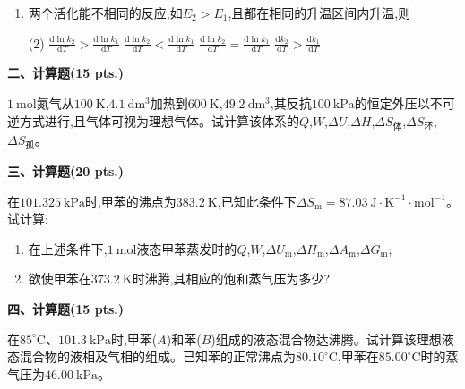 \begin{enumerate}[label=\arabic*., itemsep=1.5ex]
    \begin{tasks}(4)
        \task $(\partial H/\partial S)_p$
        \task $(\partial G/\partial T)_p$
        \task $(\partial H/\partial T)_S$
        \task $(\partial U/\partial V)_S$
    \end{tasks}
    \item 两个活化能不相同的反应,如$E_2>E_1$,且都在相同的升温区间内升温,则
    \begin{tasks}(2)
        \task $\displaystyle \frac{\mathrm{d}\ln k_2}{\mathrm{d}T}>\frac{\mathrm{d}\ln k_1}{\mathrm{d}T}$
        \task $\displaystyle \frac{\mathrm{d}\ln k_2}{\mathrm{d}T}<\frac{\mathrm{d}\ln k_1}{\mathrm{d}T}$
        \task $\displaystyle \frac{\mathrm{d}\ln k_2}{\mathrm{d}T}=\frac{\mathrm{d}\ln k_1}{\mathrm{d}T}$
        \task $\displaystyle \frac{\mathrm{d}k_2}{\mathrm{d}T}>\frac{\mathrm{d}k_1}{\mathrm{d}T}$
    \end{tasks}
\end{enumerate}

\vspace{0.5cm}
\noindent\textbf{二、计算题(15 pts.)}

$1\ \mathrm{mol}$氮气从$100\ \mathrm{K}$,$4.1\ \mathrm{dm^3}$加热到$600\ \mathrm{K}$,$49.2\ \mathrm{dm^3}$,其反抗$100\ \mathrm{kPa}$的恒定外压以不可逆方式进行,且气体可视为理想气体。试计算该体系的$Q$,$W$,$\Delta U$,$\Delta H$,$\Delta S_\text{体}$,$\Delta S_\text{环}$,$\Delta S_\text{孤}$。

\vspace{0.5cm}
\noindent\textbf{三、计算题(20 pts.)}

在$101.325\ \mathrm{kPa}$时,甲苯的沸点为$383.2\ \mathrm{K}$,已知此条件下$\Delta S_\mathrm{m}=87.03\ \mathrm{J\cdot K^{-1}\cdot mol^{-1}}$。试计算:
\begin{enumerate}[label=(\arabic*), itemsep=1ex]
    \item 在上述条件下,$1\ \mathrm{mol}$液态甲苯蒸发时的$Q$,$W$,$\Delta U_\mathrm{m}$,$\Delta H_\mathrm{m}$,$\Delta A_\mathrm{m}$,$\Delta G_\mathrm{m}$;
    \item 欲使甲苯在$373.2\ \mathrm{K}$时沸腾,其相应的饱和蒸气压为多少?
\end{enumerate}

\vspace{0.5cm}
\noindent\textbf{四、计算题(15 pts.)}

在$85^\circ\mathrm{C}$、$101.3\ \mathrm{kPa}$时,甲苯($A$)和苯($B$)组成的液态混合物达沸腾。试计算该理想液态混合物的液相及气相的组成。已知苯的正常沸点为$80.10^\circ\mathrm{C}$,甲苯在$85.00^\circ\mathrm{C}$时的蒸气压为$46.00\ \mathrm{kPa}$。

